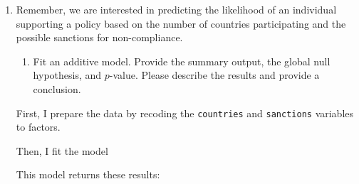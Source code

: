 \documentclass[12pt,letterpaper]{article}
\begin{document}
\begin{enumerate}
	\item
	Remember, we are interested in predicting the likelihood of an individual supporting a policy based on the number of countries participating and the possible sanctions for non-compliance.
	\begin{enumerate}
		\item [] Fit an additive model. Provide the summary output, the global null hypothesis, and $p$-value. Please describe the results and provide a conclusion.
	\end{enumerate}
	
	First, I prepare the data by recoding the \texttt{countries} and \texttt{sanctions} variables to factors. 
	 
	Then, I fit the model
	 
	
	This model returns these results:
 

\end{enumerate}
\end{document}
